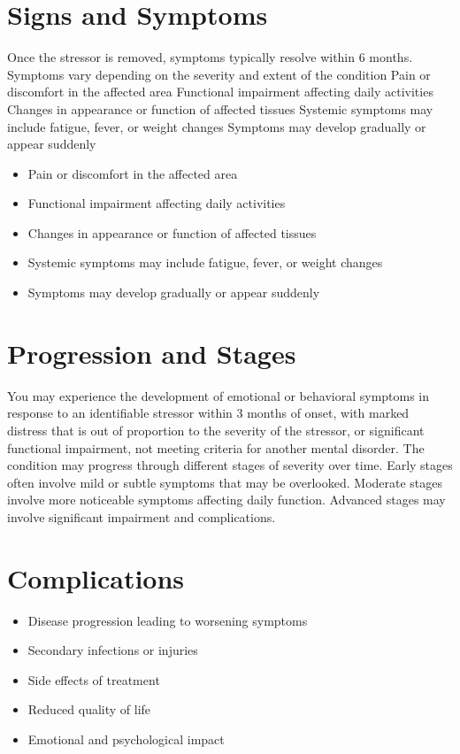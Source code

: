 \section{Signs and Symptoms}
Once the stressor is removed, symptoms typically resolve within 6 months. Symptoms vary depending on the severity and extent of the condition Pain or discomfort in the affected area Functional impairment affecting daily activities Changes in appearance or function of affected tissues Systemic symptoms may include fatigue, fever, or weight changes Symptoms may develop gradually or appear suddenly

\begin{itemize}[noitemsep]
  \item Pain or discomfort in the affected area
  \item Functional impairment affecting daily activities
  \item Changes in appearance or function of affected tissues
  \item Systemic symptoms may include fatigue, fever, or weight changes
  \item Symptoms may develop gradually or appear suddenly
\end{itemize}
\section{Progression and Stages}
You may experience the development of emotional or behavioral symptoms in response to an identifiable stressor within 3 months of onset, with marked distress that is out of proportion to the severity of the stressor, or significant functional impairment, not meeting criteria for another mental disorder. The condition may progress through different stages of severity over time. Early stages often involve mild or subtle symptoms that may be overlooked. Moderate stages involve more noticeable symptoms affecting daily function. Advanced stages may involve significant impairment and complications.
\section{Complications}
\begin{itemize}[noitemsep]
  \item Disease progression leading to worsening symptoms
  \item Secondary infections or injuries
  \item Side effects of treatment
  \item Reduced quality of life
  \item Emotional and psychological impact
\end{itemize}
